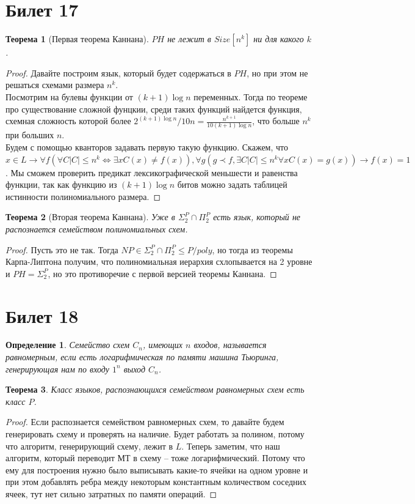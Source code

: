 \documentclass[12pt, letterpaper]{article}
\newtheorem{theorem}{Теорема}[section]
\newtheorem{defi}{Определение}[section]
\begin{document}
\section{Билет 17}
\begin{theorem}[Первая теорема Каннана]
$PH$ не лежит в $Size[n^k]$ ни для какого $k$.
\end{theorem}
\begin{proof}
Давайте построим язык, который будет содержаться в $PH$, но при этом не решаться схемами размера $n^k$. \\
Посмотрим на булевы функции от $(k+1)\log n$ переменных. Тогда по теореме про существование сложной фунцкии, среди таких функций найдется функция, схемная сложность которой более $2^{(k+1)\log n}/10n = \frac{n^{k+1}}{10(k+1)\log n}$, что больше $n^k$ при больших $n$.\\
Будем с помощью кванторов задавать первую такую функцию. Скажем, что $x \in L \rightarrow \forall f (\forall C |C| \leq n^k \Longleftrightarrow \exists x C(x) \neq f(x)), \forall g (g \prec f, \exists C |C| \leq n^k \forall x C(x) = g(x)) \rightarrow f(x) = 1$. Мы сможем проверить предикат лексикографической меньшести и равенства функции, так как функцию из $(k+1)\log n$ битов можно задать таблицей истинности полиномиального размера. 
\end{proof}

\begin{theorem}[Вторая теорема Каннана]
Уже в $\Sigma_2^P \cap \Pi_2^P$ есть язык, который не распознается семейством полиномиальных схем.
\end{theorem}
\begin{proof}
Пусть это не так. Тогда $NP \in \Sigma_2^P \cap \Pi_2^P \leq P/poly$, но тогда из теоремы Карпа-Липтона получим, что полиномиальная иерархия схлопывается на 2 уровне и $PH = \Sigma_2^P$, но это противоречие с первой версией теоремы Каннана.  
\end{proof}

\section{Билет 18}
\begin{defi}
Семейство схем $C_n$, имеющих $n$ входов, называется равномерным, если есть логарифмическая по памяти машина Тьюринга, генерирующая нам по входу $1^n$ выход $C_n$.
\end{defi}

\begin{theorem}
Класс языков, распознающихся семейством равномерных схем есть класс $P$.
\end{theorem}
\begin{proof}
Если распознается семейством равномерных схем, то давайте будем генерировать схему и проверять на наличие. Будет работать за полином, потому что алгоритм, генерирующий схему, лежит в $L$. Теперь заметим, что наш алгоритм, который переводит МТ в схему -- тоже логарифмический. Потому что ему для построения нужно было выписывать какие-то ячейки на одном уровне и при этом добавлять ребра между некоторым константным количеством соседних ячеек, тут нет сильно затратных по памяти операций.
\end{proof}
\end{document}

